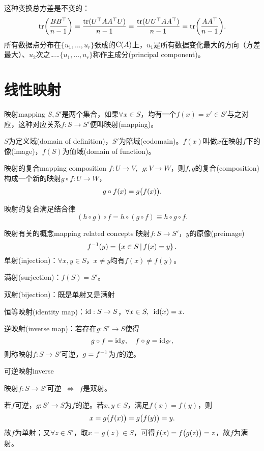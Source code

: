 这种变换总方差是不变的：
\[
	\operatorname{tr}\biggl(\frac{BB^\top}{n-1}\biggr)=\frac{\operatorname{tr}(U^\top AA^\top U)}{n-1}=\frac{\operatorname{tr}(UU^\top AA^\top)}{n-1}=\operatorname{tr}\biggl(\frac{AA^\top}{n-1}\biggr).
\]
所有数据点分布在$\{u_1,\ldots,u_r\}$张成的$\operatorname{C}(A)$上，$u_1$是所有数据变化最大的方向（方差最大）、$u_2$次之……$\{u_1,\ldots,u_r\}$称作主成分(principal component)。
\clearpage
\section{线性映射}
\label{sec:linear mapping}
\begin{definition}{映射}{mapping}
	$S,S'$是两个集合，如果$\forall x\in S$，均有一个$f(x)=x'\in S'$与之对应，这种对应关系$f:S\to S'$便叫映射(mapping)。

	$S$为定义域(domain of definition)，$S'$为陪域(codomain)。$f(x)$叫做$x$在映射$f$下的像(image)，$f(S)$为值域(domain of function)。
\end{definition}
\begin{definition}{映射的复合}{mapping composition}
	$f:U\to V,\enspace g:V\to W$，则$f,g$的复合(composition)构成一个新的映射$g\circ f:U\to W$，
	\[
		g\circ f(x)=g\bigl(f(x)\bigr).
	\]
\end{definition}
映射的复合满足结合律
\[
	(h\circ g)\circ f=h\circ (g\circ f)\equiv h\circ g\circ f.
\]
\begin{definition}{映射有关的概念}{mapping related concepts}
	映射$f:S\to S'$，$y$的原像(preimage)
	\[
		f^{-1}(y)=\left\{x\in S\,\middle\vert\,f(x)=y\right\}.
	\]
	单射(injection)：$\forall x,y\in S$，$x\neq y$均有$f(x)\neq f(y)$。

	满射(surjection)：$f(S)=S'$。

	双射(bijection)：既是单射又是满射

	恒等映射(identity map)：$\operatorname{id}:S\to S$，$\forall x\in S,\enspace\operatorname{id}(x)=x.$

	逆映射(inverse map)：若存在$g:S'\to S$使得
	\[
		g\circ f=\operatorname{id}_S,\quad f\circ g=\operatorname{id}_{S'},
	\]
	则称映射$f:S\to S'$可逆，$g=f^{-1}$为$f$的逆。
\end{definition}
\begin{theorem}{可逆映射}{inverse}
	\begin{center}
		映射$f:S\to S'$可逆$\enspace\Leftrightarrow\enspace f$是双射。
	\end{center}
\end{theorem}
\prf 若$f$可逆，$g:S'\to S$为$f$的逆。若$x,y\in S$，满足$f(x)=f(y)$，则 
\[
	x=g\bigl(f(x)\bigr)=g\bigl(f(y)\bigr)=y.
\]
故$f$为单射；又$\forall z\in S'$，取$x=g(z)\in S$，可得$f(x)=f\bigl(g(z)\bigr)=z$，故$f$为满射。

